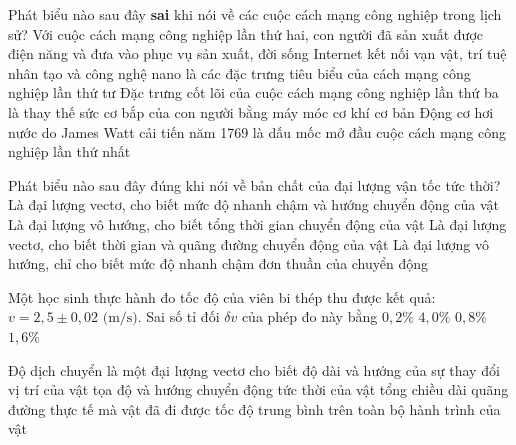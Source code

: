 \begin{ex}
	Phát biểu nào sau đây \textbf{sai} khi nói về các cuộc cách mạng công nghiệp trong lịch sử?
	\choice
	{Với cuộc cách mạng công nghiệp lần thứ hai, con người đã sản xuất được điện năng và đưa vào phục vụ sản xuất, đời sống}
	{Internet kết nối vạn vật, trí tuệ nhân tạo và công nghệ nano là các đặc trưng tiêu biểu của cách mạng công nghiệp lần thứ tư}
	{\True Đặc trưng cốt lõi của cuộc cách mạng công nghiệp lần thứ ba là thay thế sức cơ bắp của con người bằng máy móc cơ khí cơ bản}
	{Động cơ hơi nước do James Watt cải tiến năm 1769 là dấu mốc mở đầu cuộc cách mạng công nghiệp lần thứ nhất}
\end{ex}

\begin{ex}
	Phát biểu nào sau đây đúng khi nói về bản chất của đại lượng vận tốc tức thời?
	\choice
	{\True Là đại lượng vectơ, cho biết mức độ nhanh chậm và hướng chuyển động của vật}
	{Là đại lượng vô hướng, cho biết tổng thời gian chuyển động của vật}
	{Là đại lượng vectơ, cho biết thời gian và quãng đường chuyển động của vật}
	{Là đại lượng vô hướng, chỉ cho biết mức độ nhanh chậm đơn thuần của chuyển động}
\end{ex}

\begin{ex}
	Một học sinh thực hành đo tốc độ của viên bi thép thu được kết quả: $v = 2{,}5 \pm 0{,}02\text{ (m/s)}$. Sai số tỉ đối $\delta v$ của phép đo này bằng
	\choice
	{$0{,}2\%$}
	{$4{,}0\%$}
	{\True $0{,}8\%$}
	{$1{,}6\%$}
\end{ex}

\begin{ex}
	Độ dịch chuyển là một đại lượng vectơ cho biết
	\choice
	{\True độ dài và hướng của sự thay đổi vị trí của vật}
	{tọa độ và hướng chuyển động tức thời của vật}
	{tổng chiều dài quãng đường thực tế mà vật đã đi được}
	{tốc độ trung bình trên toàn bộ hành trình của vật}
\end{ex}

